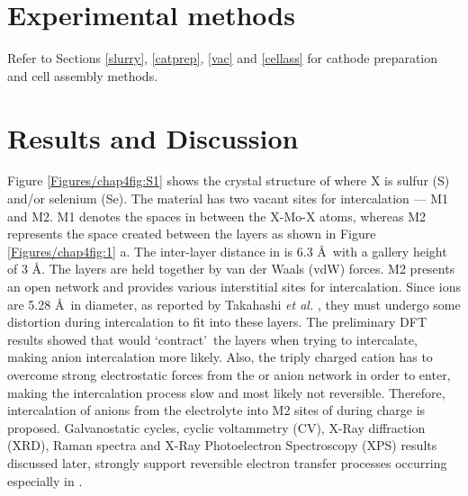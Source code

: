 \section{Experimental methods}
Refer to Sections \ref{slurry}, \ref{catprep}, \ref{vac} and \ref{cellass} for cathode preparation and cell assembly methods. 

\section{Results and Discussion}
Figure \ref{Figures/chap4fig:S1} shows the crystal structure of  where X is sulfur (S) and/or selenium (Se). The material has two vacant sites for intercalation --- M1 and M2. M1 denotes the spaces in between the X-Mo-X atoms, whereas M2 represents the space created between the  layers as shown in Figure \ref{Figures/chap4fig:1} a. The inter-layer distance in  is 6.3 \AA\ with a gallery height of 3 \AA. The layers are held together by van der Waals (vdW) forces. M2 presents an open network and provides various interstitial sites for intercalation. Since  ions are 5.28 \AA\ in diameter, as reported by Takahashi {\it et al.} \cite{takahashi_niv2o5nh2o_2005}, they must undergo some distortion during intercalation to fit into these layers. The preliminary DFT results showed that  would \lq contract\rq\ the  layers when trying to intercalate, making  anion intercalation more likely. Also, the triply charged  cation has to overcome strong electrostatic forces from the  or  anion network in order to enter, making the intercalation process slow and most likely not reversible. Therefore, intercalation of  anions from the electrolyte into M2 sites of  during charge is proposed. Galvanostatic cycles, cyclic voltammetry (CV), X-Ray diffraction (XRD), Raman spectra and X-Ray Photoelectron Spectroscopy (XPS) results discussed later, strongly support reversible electron transfer processes occurring especially in .

